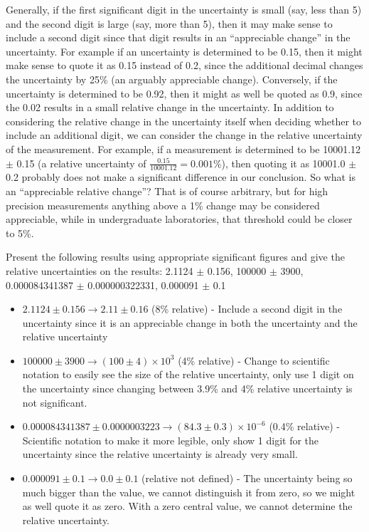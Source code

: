 Generally, if the first significant digit in the uncertainty is small (say, less than 5) and the second digit is large (say, more than 5), then it may make sense to include a second digit since that digit results in an ``appreciable change'' in the uncertainty. For example if an uncertainty is determined to be 0.15, then it might make sense to quote it as 0.15 instead of 0.2, since the additional decimal changes the uncertainty by 25\% (an arguably appreciable change). Conversely, if the uncertainty is determined to be 0.92, then it might as well be quoted as 0.9, since the 0.02 results in a small relative change in the uncertainty. In addition to considering the relative change in the uncertainty itself when deciding whether to include an additional digit, we can consider the change in the relative uncertainty of the measurement. For example, if a measurement is determined to be 10001.12 $\pm$ 0.15 (a relative uncertainty of $\frac{0.15}{10001.12}=0.001\%$), then quoting it as 10001.0 $\pm$ 0.2 probably does not make a significant difference in our conclusion. So what is an ``appreciable relative change''? That is of course arbitrary, but for high precision measurements anything above a 1\% change may be considered appreciable, while in undergraduate laboratories, that threshold could be closer to 5\%. 

\begin{example}{0pt}{Present the following results using appropriate significant figures and give the relative uncertainties on the results: 2.1124 $\pm$ 0.156, 100000 $\pm$ 3900, 0.000084341387 $\pm$ 0.000000322331, 0.000091 $\pm$ 0.1}{}
\begin{itemize}
 \item $2.1124 \pm 0.156 \rightarrow 2.11 \pm 0.16$ (8\% relative) - Include a second digit in the uncertainty since it is an appreciable change in both the uncertainty and the relative uncertainty
 \item $100000 \pm 3900 \rightarrow (100 \pm 4)\times 10^3$ (4\% relative) - Change to scientific notation to easily see the size of the relative uncertainty, only use 1 digit on the uncertainty since changing between 3.9\% and 4\% relative uncertainty is not significant.
 \item $0.000084341387 \pm 0.0000003223 \rightarrow (84.3 \pm 0.3)\times 10^{-6}$ (0.4\% relative) - Scientific notation to make it more legible, only show 1 digit for the uncertainty since the relative uncertainty is already very small.
 \item $0.000091 \pm 0.1 \rightarrow 0.0 \pm 0.1$ (relative not defined) - The uncertainty being so much bigger than the value, we cannot distinguish it from zero, so we might as well quote it as zero. With a zero central value, we cannot determine the relative uncertainty. 
\end{itemize}

\end{example}

